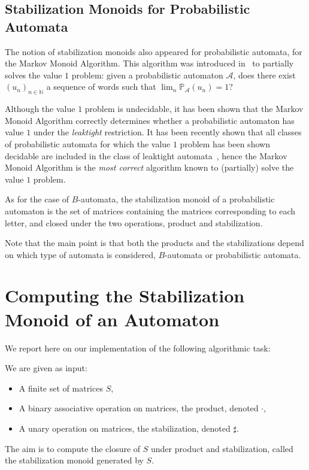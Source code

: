\documentclass[11pt]{llncs}
\newcommand{\N}{\mathbb{N}}
\newcommand{\A}{\mathcal{A}}
\begin{document}

\subsection{Stabilization Monoids for Probabilistic Automata}

The notion of stabilization monoids also appeared for probabilistic automata, for the Markov Monoid Algorithm.
This algorithm was introduced in~\cite{FGO12} to partially solves the value $1$ problem: given a probabilistic automaton $\A$,
does there exist $(u_n)_{n \in \N}$ a sequence of words such that $\lim_n \mathbb{P}_\A(u_n) = 1$?

Although the value $1$ problem is undecidable, it has been shown that
the Markov Monoid Algorithm correctly determines whether a probabilistic automaton has value $1$
under the \textit{leaktight} restriction.
It has been recently shown that all classes of probabilistic automata for which the value $1$ problem has been shown decidable 
are included in the class of leaktight automata~\cite{FGKO14},
hence the Markov Monoid Algorithm is the \textit{most correct} algorithm known to (partially) solve the value $1$ problem.

As for the case of $B$-automata, the stabilization monoid of a probabilistic automaton
is the set of matrices containing the matrices corresponding to each letter,
and closed under the two operations, product and stabilization.

Note that the main point is that both the products and the stabilizations depend on which type of automata is considered,
$B$-automata or probabilistic automata.

\section{Computing the Stabilization Monoid of an Automaton}

We report here on our implementation of the following algorithmic task:
\begin{framed}
We are given as input:
\begin{itemize}
	\item A finite set of matrices $S$,
	\item A binary associative operation on matrices, the product, denoted $\cdot$,
	\item A unary operation on matrices, the stabilization, denoted $\sharp$.
\end{itemize}
The aim is to compute the closure of $S$ under product and stabilization,
called the stabilization monoid generated by $S$.
\end{framed}
\end{document}
